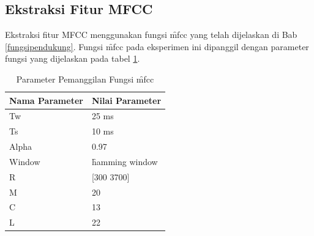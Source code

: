\subsection{Ekstraksi Fitur MFCC} \label{chap:ekstrak fitur mfcc}
Ekstraksi fitur MFCC menggunakan fungsi \f{mfcc} yang telah dijelaskan di Bab \ref{fungsipendukung}. Fungsi \f{mfcc} pada eksperimen ini dipanggil dengan parameter fungsi yang dijelaskan pada tabel \ref{table:pemanggilanmfcc}.
\begin{table}
	\centering
  \caption{Parameter Pemanggilan Fungsi \f{mfcc}}
  \begin{tabular}{|l|l|}
    \hline
    \textbf{Nama Parameter} & \textbf{Nilai Parameter} \\ \hline
    Tw & 25 ms \\ \hline
    Ts & 10 ms \\ \hline
    Alpha & 0.97 \\ \hline
    Window & \f{hamming window}  \\ \hline
    R & [300 3700] \\ \hline
    M & 20 \\ \hline
    C & 13 \\ \hline
    L & 22 \\ \hline
  \end{tabular}
  \label{table:pemanggilanmfcc}
 \end{table}


